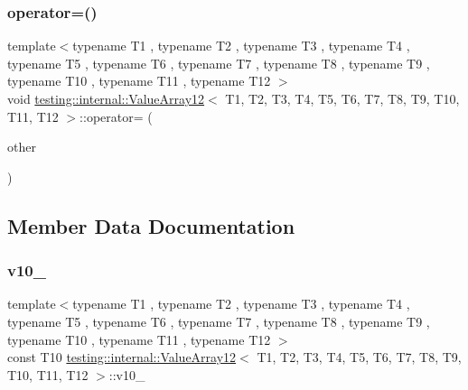 \mbox{\label{classtesting_1_1internal_1_1_value_array12_a915c92478f363d4588ceea7d28760ab9}} 
\subsubsection{\texorpdfstring{operator=()}{operator=()}}
{\footnotesize\ttfamily template$<$typename T1 , typename T2 , typename T3 , typename T4 , typename T5 , typename T6 , typename T7 , typename T8 , typename T9 , typename T10 , typename T11 , typename T12 $>$ \\
void \mbox{\hyperlink{classtesting_1_1internal_1_1_value_array12}{testing\+::internal\+::\+Value\+Array12}}$<$ T1, T2, T3, T4, T5, T6, T7, T8, T9, T10, T11, T12 $>$\+::operator= (\begin{DoxyParamCaption}\item[{const \mbox{\hyperlink{classtesting_1_1internal_1_1_value_array12}{Value\+Array12}}$<$ T1, T2, T3, T4, T5, T6, T7, T8, T9, T10, T11, T12 $>$ \&}]{other }\end{DoxyParamCaption})\hspace{0.3cm}{\ttfamily [private]}}



\subsection{Member Data Documentation}
\mbox{\label{classtesting_1_1internal_1_1_value_array12_aa613601640f903e6194be77bce3e6fe6}} 
\subsubsection{\texorpdfstring{v10\_}{v10\_}}
{\footnotesize\ttfamily template$<$typename T1 , typename T2 , typename T3 , typename T4 , typename T5 , typename T6 , typename T7 , typename T8 , typename T9 , typename T10 , typename T11 , typename T12 $>$ \\
const T10 \mbox{\hyperlink{classtesting_1_1internal_1_1_value_array12}{testing\+::internal\+::\+Value\+Array12}}$<$ T1, T2, T3, T4, T5, T6, T7, T8, T9, T10, T11, T12 $>$\+::v10\+\_\+\hspace{0.3cm}{\ttfamily [private]}}

